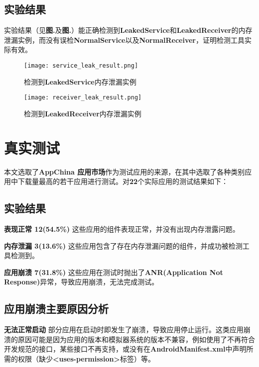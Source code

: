 \subsection{实验结果}
实验结果（见\textbf{图.}\redbf{\ref{fig:result of mock receiver}}及\textbf{图.}\redbf{\ref{fig:result of mock service}}）能正确检测到\textbf{LeakedService}和\textbf{LeakedReceiver}的内存泄漏实例，而没有误检\textbf{NormalService}以及\textbf{NormalReceiver}，证明检测工具实际有效。

\begin{figure}[htbp]
	\centering
	\texttt{[image: service\_leak\_result.png]} %
	\caption{检测到\textbf{LeakedService}内存泄漏实例}
	\label{fig:result of mock service}
\end{figure}
\begin{figure}[htbp]
\centering
\texttt{[image: receiver\_leak\_result.png]} %
\caption{检测到\textbf{LeakedReceiver}内存泄漏实例}
\label{fig:result of mock receiver}
\end{figure}

\section{真实测试}


本文选取了\textbf{AppChina 应用市场}\cite{appchina}作为测试应用的来源，在其中选取了各种类别应用中下载量最高的若干应用进行测试。对\textbf{22}个实际应用的测试结果如下：

\subsection{实验结果}\label{now-result}
\textbf{表现正常 12(54.5\%) }这些应用的组件表现正常，并没有出现内存泄露问题。

\textbf{内存泄漏 3(13.6\%) }这些应用包含了存在内存泄漏问题的组件，并成功被检测工具检测到。

\textbf{应用崩溃 7(31.8\%) }这些应用在测试时抛出了\textbf{ANR(Application Not Response)}异常，导致应用崩溃，无法完成测试。

\subsection{应用崩溃主要原因分析}

\textbf{无法正常启动 } 部分应用在启动时即发生了崩溃，导致应用停止运行。这类应用崩溃的原因可能是因为应用的版本和模拟器系统的版本不兼容，例如使用了不再符合开发规范的接口，某些接口不再支持，或没有在\textbf{AndroidManifest.xml}中声明所需的权限（缺少\textbf{<uses-permission>}标签）等。

